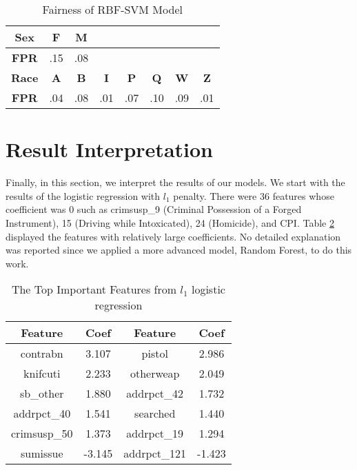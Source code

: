 \begin{table}[htb]
\centering
\begin{tabular}{cccccccc}
\hline
\textbf{Sex} & \textbf{F} & \textbf{M} &            &            &            &            &            \\ \hline
\textbf{FPR}    & .15        & .08        &            &            &            &            &            \\ \hline
\textbf{Race }       & \textbf{A} & \textbf{B} & \textbf{I} & \textbf{P} & \textbf{Q} & \textbf{W} & \textbf{Z} \\ \hline
\textbf{FPR}    & .04       & .08       & .01        & .07        & .10        & .09        & .01   \\  \hline  
\end{tabular}
\caption{Fairness of RBF-SVM Model}
\label{table:fair-SVM}
\end{table}

\section{Result Interpretation} \label{sec:interpret}
Finally, in this section, we interpret the results of our models. We start with the results of the logistic regression with $l_1$ penalty. There were 36 features whose coefficient was 0 such as crimsusp\_9 (Criminal Possession of a Forged Instrument), 15 (Driving while Intoxicated), 24 (Homicide), and CPI. Table \ref{Table:lrtf} displayed the features with relatively large coefficients. No detailed explanation was reported since we applied a more advanced model, Random Forest, to do this work.

\begin{table}[htbp]
    \centering
    \begin{tabular}{cccc} \hline
    \textbf{Feature} & \textbf{Coef} & \textbf{Feature} & \textbf{Coef}\\ \hline
    contrabn         & 3.107    &        
    pistol        & 2.986\\            
    knifcuti            & 2.233   &         
    otherweap         & 2.049\\            
    sb\_other     & 1.880     &  
    addrpct\_42         & 1.732 \\         
    addrpct\_40          & 1.541 &
    searched           &1.440\\ 
    crimsusp\_50     &1.373&
    addrpct\_19     &1.294\\
    sumissue     & -3.145&
    addrpct\_121 & -1.423\\
    \hline
    \end{tabular}
    \caption{The Top Important Features from $l_1$ logistic regression}
    \label{Table:lrtf}
\end{table}


